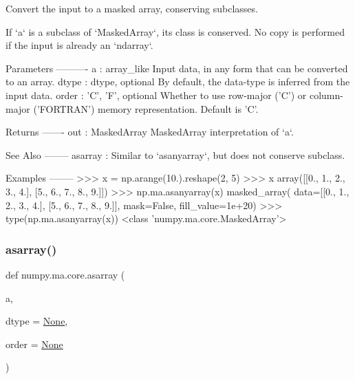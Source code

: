 \begin{DoxyVerb}Convert the input to a masked array, conserving subclasses.

If `a` is a subclass of `MaskedArray`, its class is conserved.
No copy is performed if the input is already an `ndarray`.

Parameters
----------
a : array_like
    Input data, in any form that can be converted to an array.
dtype : dtype, optional
    By default, the data-type is inferred from the input data.
order : {'C', 'F'}, optional
    Whether to use row-major ('C') or column-major ('FORTRAN') memory
    representation.  Default is 'C'.

Returns
-------
out : MaskedArray
    MaskedArray interpretation of `a`.

See Also
--------
asarray : Similar to `asanyarray`, but does not conserve subclass.

Examples
--------
>>> x = np.arange(10.).reshape(2, 5)
>>> x
array([[0., 1., 2., 3., 4.],
       [5., 6., 7., 8., 9.]])
>>> np.ma.asanyarray(x)
masked_array(
  data=[[0., 1., 2., 3., 4.],
        [5., 6., 7., 8., 9.]],
  mask=False,
  fill_value=1e+20)
>>> type(np.ma.asanyarray(x))
<class 'numpy.ma.core.MaskedArray'>\end{DoxyVerb}
 \mbox{\label{namespacenumpy_1_1ma_1_1core_aaff6d29c0fe98579d611f41dfd1d0c89}} 
\subsubsection{\texorpdfstring{asarray()}{asarray()}}
{\footnotesize\ttfamily def numpy.\+ma.\+core.\+asarray (\begin{DoxyParamCaption}\item[{}]{a,  }\item[{}]{dtype = {\ttfamily \hyperlink{namespacenumpy_1_1ma_1_1core_a647ee1848dfa3692fe35a663a2aa40b3}{None}},  }\item[{}]{order = {\ttfamily \hyperlink{namespacenumpy_1_1ma_1_1core_a647ee1848dfa3692fe35a663a2aa40b3}{None}} }\end{DoxyParamCaption})}

